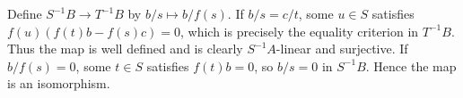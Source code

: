 Define $S^{-1}B\to T^{-1}B$ by $b/s\mapsto b/f(s)$. If $b/s=c/t$, some $u\in S$ satisfies $f(u)(f(t)b-f(s)c)=0$, which is precisely the equality criterion in $T^{-1}B$. Thus the map is well defined and is clearly $S^{-1}A$-linear and surjective. If $b/f(s)=0$, some $t\in S$ satisfies $f(t)b=0$, so $b/s=0$ in $S^{-1}B$. Hence the map is an isomorphism.
